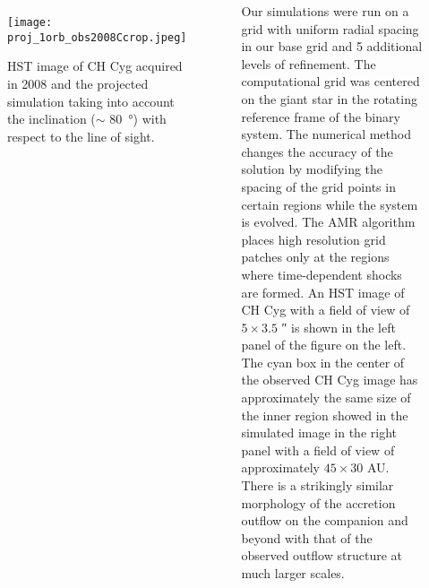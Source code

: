 \documentclass[blockbodyinnersep=1cm,titleinnersep=1cm]{tikzposter}
\begin{document}
\begin{columns}
{\begin{wrapfigure}{l}{0.6\textwidth}
  \centering
  \texttt{[image: proj\_1orb\_obs2008Ccrop.jpeg]}
  \caption*{
  HST image of CH Cyg acquired in 2008 \citep{2010ApJ...710L.132K}
  and the projected simulation taking into account the inclination
  ($\sim$ \SI{80}{\degree}) with respect to the line of sight.
}
\end{wrapfigure}
Our simulations were run on a grid with uniform radial spacing in our base grid
and 5 additional levels of refinement.  The computational grid was centered on
the giant star in the rotating reference frame of the binary system.  The
numerical method changes the accuracy of the solution by modifying the spacing
of the grid points in certain regions while the system is evolved.  The AMR
algorithm places high resolution grid patches only at the regions where
time-dependent shocks are formed.  An HST image of CH Cyg with a field of view
of $5 \times 3.5$ \si{\arcsecond} is shown in the left panel of the figure on
the left. The cyan box in the center of the observed CH Cyg image has
approximately the same size of the inner region showed in the simulated image
in the right panel with a field of view of approximately $45 \times 30$ AU.
There is a strikingly similar morphology of the accretion outflow on the
companion and beyond with that of the observed outflow structure at much larger
scales.}


\end{columns}
\end{document}
